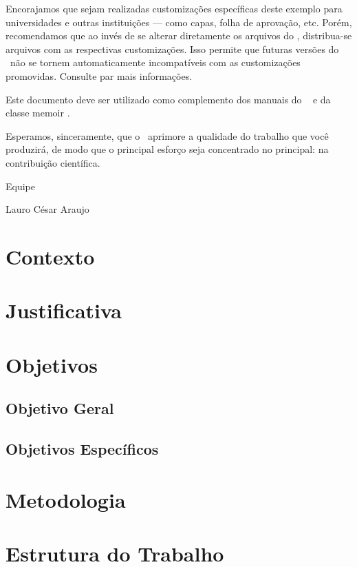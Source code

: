 \documentclass[
	12pt,				%
	openright,			%
	oneside,			%
	a4paper,			%
	chapter=TITLE,		%
	english,			%
	french,				%
	spanish,			%
	brazil				%
	]{abntex2}
\theoremstyle{definition}
\begin{document}
Encorajamos que sejam realizadas customizações específicas deste exemplo para
universidades e outras instituições --- como capas, folha de aprovação, etc.
Porém, recomendamos que ao invés de se alterar diretamente os arquivos do
\abnTeX, distribua-se arquivos com as respectivas customizações.
Isso permite que futuras versões do \abnTeX~não se tornem automaticamente
incompatíveis com as customizações promovidas. Consulte
 par mais informações.

Este documento deve ser utilizado como complemento dos manuais do \abnTeX\ 
\cite{abntex2classe,abntex2cite,abntex2cite-alf} e da classe \textsf{memoir}
\cite{memoir}. 

Esperamos, sinceramente, que o \abnTeX\ aprimore a qualidade do trabalho que
você produzirá, de modo que o principal esforço seja concentrado no principal:
na contribuição científica.

Equipe \abnTeX 

Lauro César Araujo

\section{Contexto}

\section{Justificativa}

\section{Objetivos}

\subsection{Objetivo Geral}

\subsection{Objetivos Específicos}

\section{Metodologia}

\section{Estrutura do Trabalho}
\end{document}
